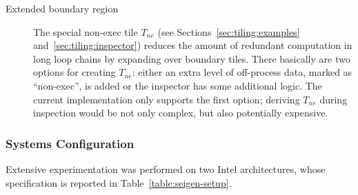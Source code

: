 \begin{description}
\item[Extended boundary region] The special non-exec tile $T_{ne}$ (see Sections~\ref{sec:tiling:examples} and~\ref{sec:tiling:inspector}) reduces the amount of redundant computation in long loop chains by expanding over boundary tiles. There basically are two options for creating $T_{ne}$: either an extra level of off-process data, marked as ``non-exec'', is added or the inspector has some additional logic. The current implementation only supports the first option; deriving $T_{ne}$ during inspection would be not only complex, but also potentially expensive. 
\end{description}



\subsubsection{Systems Configuration}
Extensive experimentation was performed on two Intel architectures, whose specification is reported in Table~\ref{table:seigen-setup}. 

\begin{table}[htpb]
\scriptsize
{}
\caption{Systems specification.}
\label{table:seigen-setup}
\end{table}

